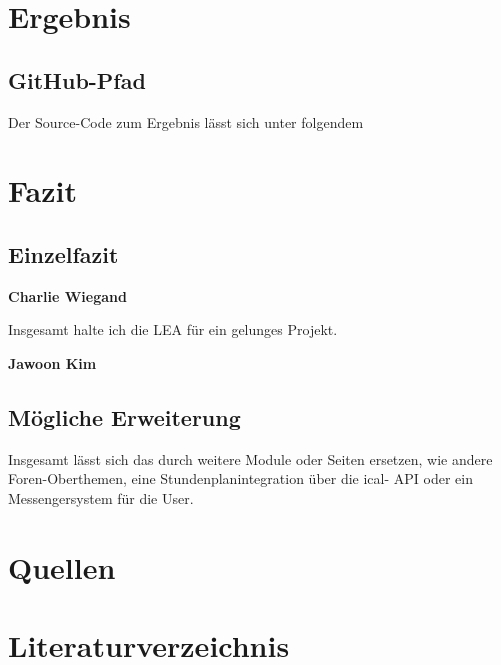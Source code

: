 \documentclass[12pt,titlepage]{article}
\begin{document}
\section{Ergebnis}

\subsection{GitHub-Pfad}

Der Source-Code zum Ergebnis lässt sich unter folgendem


\section{Fazit}

\subsection{Einzelfazit}
\textbf{Charlie Wiegand}

Insgesamt halte ich die LEA für ein gelunges Projekt.


\textbf{Jawoon Kim}

\subsection{Mögliche Erweiterung}

Insgesamt lässt sich das durch weitere Module oder Seiten ersetzen, wie andere Foren-Oberthemen, eine Stundenplanintegration über die ical- API oder 
ein Messengersystem für die User.

\section{Quellen}

\section{Literaturverzeichnis}
\end{document}
